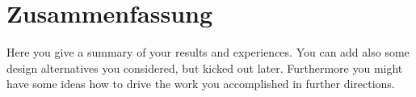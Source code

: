 \chapter{Zusammenfassung}
Here you give a summary of your results and experiences. You can add also some design alternatives you considered, but kicked out later. Furthermore you might have some ideas how to drive the work you accomplished in further directions.

